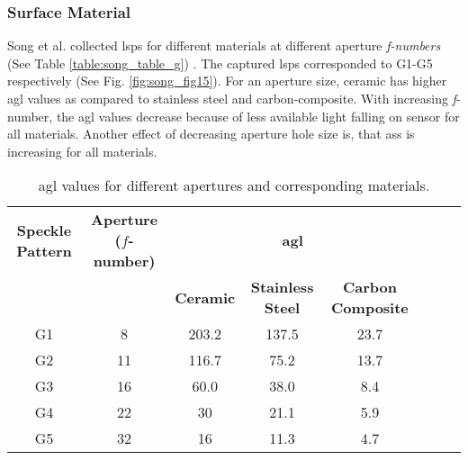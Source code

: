     \subsubsection{Surface Material}
    Song et al. collected \glspl{lsp} for different materials at different aperture \emph{f-numbers} (See Table \ref{table:song_table_g}) \cite{song}. The captured \glspl{lsp} corresponded to G1-G5 respectively (See Fig. \ref{fig:song_fig15}). For an aperture size, ceramic has higher \gls{agl} values as compared to stainless steel and carbon-composite. With increasing \emph{f}-number, the \gls{agl} values decrease because of less available light falling on sensor for all materials. Another effect of decreasing aperture hole size is, that \gls{ass} is increasing for all materials.
    \begin{table}[h]
        \centering
        \begin{subtable}{\textwidth}
            \centering
            \footnotesize
            \begin{tabular}{cccccccc}
                \toprule
                \textbf{Speckle Pattern} & \textbf{Aperture ($f$-number)} & \multicolumn{3}{c}{\textbf{\gls{agl}}} \\
                &  & \multicolumn{1}{c}{\textbf{Ceramic}} & \multicolumn{1}{c}{\textbf{Stainless Steel}} & \multicolumn{1}{c}{\textbf{Carbon Composite}} \\
                \midrule
                G1 & 8 & 203.2 & 137.5 & 23.7 \\
                G2 & 11 & 116.7 & 75.2 & 13.7 \\
                G3 & 16 & 60.0 & 38.0 & 8.4 \\
                G4 & 22 & 30 & 21.1 & 5.9 \\
                G5 & 32 & 16 & 11.3 & 4.7 \\
                \bottomrule
            \end{tabular}
        \caption{\gls{agl} values for different apertures and corresponding materials.}
        \end{subtable}
        
        \vspace{3mm}


\end{table}
